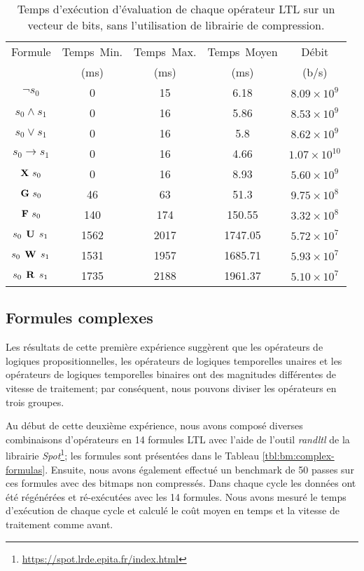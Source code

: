 \begin{table}
\centering
\small
\begin{tabular}{|c|c|c|c|c|}
\hline
Formule & Temps\ Min. & Temps\ Max. & Temps\ Moyen & Débit \\
& (ms) & (ms) & (ms) & (b/s) \\
\hline
$\neg s_0$ & 0 & 15 & 6.18 & $8.09 \times 10^{9}$ \\
\hline
$s_0 \wedge s_1$ & 0 & 16 & 5.86 & $8.53 \times 10^{9}$ \\
\hline
$s_0 \vee s_1$ & 0 & 16 & 5.8 & $8.62 \times 10^{9}$ \\
\hline
$s_0 \rightarrow s_1$ & 0 & 16 & 4.66 & $1.07 \times 10^{10}$ \\
\hline
$\mathop{\mbox{\textbf{X}}}\, s_0$ & 0 & 16 & 8.93 & $5.60 \times 10^{9}$ \\
\hline
$\mathop{\mbox{\textbf{G}}}\, s_0$ & 46 & 63 & 51.3 & $9.75 \times 10^8$ \\
\hline
$\mathop{\mbox{\textbf{F}}}\, s_0$ & 140 & 174 & 150.55 & $3.32 \times 10^8$ \\
\hline
$s_0 \mathrel{\mbox{\,\textbf{U}}}\, s_1$ & 1562 & 2017 & 1747.05 & $5.72 \times 10^7$ \\
\hline
$s_0 \mathrel{\mbox{\,\textbf{W}}}\, s_1$ & 1531 & 1957 & 1685.71 & $5.93 \times 10^7$ \\
\hline
$s_0 \mathrel{\mbox{\,\textbf{R}}}\, s_1$ & 1735 & 2188 & 1961.37 & $5.10 \times 10^7$ \\
\hline
\end{tabular}
\vskip 8pt
\caption{Temps d'exécution d'évaluation de chaque opérateur LTL sur un vecteur de bits, sans l'utilisation de librairie de compression.}
\label{tbl:bm:basicops}
\end{table}


\subsection{Formules complexes} %

Les résultats de cette première expérience suggèrent que les opérateurs de logiques propositionnelles, les opérateurs de logiques temporelles unaires et les opérateurs de logiques temporelles binaires ont des magnitudes différentes de vitesse de traitement; par conséquent, nous pouvons diviser les opérateurs en trois groupes.

Au début de cette deuxième expérience, nous avons composé diverses combinaisons d'opérateurs en 14 formules LTL avec l'aide de l'outil \emph {randltl} de la librairie \textit{Spot}\footnote{\url{https://spot.lrde.epita.fr/index.html}}; les formules sont présentées dans le Tableau \ref{tbl:bm:complex-formulas}. Ensuite, nous avons également effectué un benchmark de 50 passes sur ces formules avec des bitmaps non compressés. Dans chaque cycle les données ont été régénérées et ré-exécutées avec les 14 formules. Nous avons mesuré le temps d'exécution de chaque cycle et calculé le coût moyen en temps et la vitesse de traitement comme avant.

